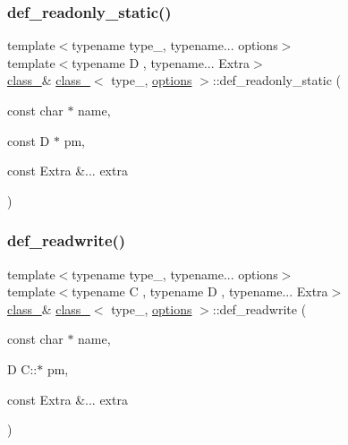 \mbox{\label{classclass___aaa095752a8d0fc1bd45e4404502df5e9}} 
\subsubsection{\texorpdfstring{def\_readonly\_static()}{def\_readonly\_static()}}
{\footnotesize\ttfamily template$<$typename type\+\_\+, typename... options$>$ \\
template$<$typename D , typename... Extra$>$ \\
\mbox{\hyperlink{classclass__}{class\+\_\+}}\& \mbox{\hyperlink{classclass__}{class\+\_\+}}$<$ type\+\_\+, \mbox{\hyperlink{classoptions}{options}} $>$\+::def\+\_\+readonly\+\_\+static (\begin{DoxyParamCaption}\item[{const char $\ast$}]{name,  }\item[{const D $\ast$}]{pm,  }\item[{const Extra \&...}]{extra }\end{DoxyParamCaption})\hspace{0.3cm}{\ttfamily [inline]}}

\mbox{\label{classclass___a3018817da2690cc989745c7d744438cb}} 
\subsubsection{\texorpdfstring{def\_readwrite()}{def\_readwrite()}}
{\footnotesize\ttfamily template$<$typename type\+\_\+, typename... options$>$ \\
template$<$typename C , typename D , typename... Extra$>$ \\
\mbox{\hyperlink{classclass__}{class\+\_\+}}\& \mbox{\hyperlink{classclass__}{class\+\_\+}}$<$ type\+\_\+, \mbox{\hyperlink{classoptions}{options}} $>$\+::def\+\_\+readwrite (\begin{DoxyParamCaption}\item[{const char $\ast$}]{name,  }\item[{D C\+::$\ast$}]{pm,  }\item[{const Extra \&...}]{extra }\end{DoxyParamCaption})\hspace{0.3cm}{\ttfamily [inline]}}

